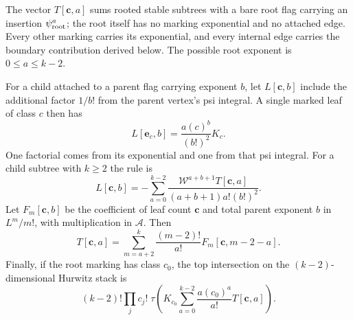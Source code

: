 The vector $T[\mathbf c,a]$ sums rooted stable subtrees with a bare
root flag carrying an insertion $\psi_{\rm root}^{a}$; the root
itself has no marking exponential and no attached edge.  Every
other marking carries its exponential, and every internal edge
carries the boundary contribution derived below.  The possible
root exponent is $0\le a\le k-2$.

For a child attached to a parent flag carrying exponent $b$, let
$L[\mathbf c,b]$ include the additional factor $1/b!$ from the
parent vertex's psi integral.  A single marked leaf of class $c$
then has
\[
              L[\mathbf e_c,b]=\frac{a(c)^b}{(b!)^2}K_c.       \tag{E8.9}
\]
One factorial comes from its exponential and one from that psi
integral.  For a child subtree with $k\ge2$ the rule is
\[
 L[\mathbf c,b]=-
    \sum_{a=0}^{k-2}
       \frac{\mathcal W^{a+b+1}T[\mathbf c,a]}
            {(a+b+1)a!(b!)^2}.                               \tag{E8.10}
\]
Let $F_m[\mathbf c,b]$ be the coefficient of leaf count
$\mathbf c$ and total parent exponent $b$ in $L^m/m!$, with
multiplication in $\mathcal A$.  Then
\[
 T[\mathbf c,a]=
       \sum_{m=a+2}^{k}\frac{(m-2)!}{a!}
                    F_m[\mathbf c,m-2-a].                   \tag{E8.11}
\]
Finally, if the root marking has class $c_0$, the top intersection
on the $(k-2)$-dimensional Hurwitz stack is
\[
 (k-2)!\prod_jc_j!\;
 \tau\left(K_{c_0}\sum_{a=0}^{k-2}
                     \frac{a(c_0)^a}{a!}T[\mathbf c,a]\right).
                                                                  \tag{E8.12}
\]

